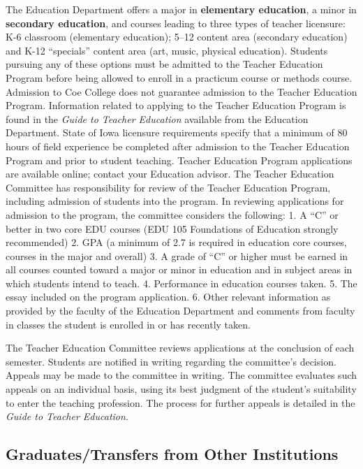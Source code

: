 \documentclass[
  letterpaper,
]{scrbook}
\begin{document}
The Education Department offers a major in \textbf{elementary
education}, a minor in \textbf{secondary education}, and courses leading
to three types of teacher licensure: K-6 classroom (elementary
education); 5--12 content area (secondary education) and K-12
``specials'' content area (art, music, physical education). Students
pursuing any of these options must be admitted to the Teacher Education
Program before being allowed to enroll in a practicum course or methods
course. Admission to Coe College does not guarantee admission to the
Teacher Education Program. Information related to applying to the
Teacher Education Program is found in the \emph{Guide to Teacher
Education} available from the Education Department. State of Iowa
licensure requirements specify that a minimum of 80 hours of field
experience be completed after admission to the Teacher Education Program
and prior to student teaching. Teacher Education Program applications
are available online; contact your Education advisor. The Teacher
Education Committee has responsibility for review of the Teacher
Education Program, including admission of students into the program. In
reviewing applications for admission to the program, the committee
considers the following: 1. A ``C'' or better in two core EDU courses
(EDU 105 Foundations of Education strongly recommended) 2. GPA (a
minimum of 2.7 is required in education core courses, courses in the
major and overall) 3. A grade of ``C'' or higher must be earned in all
courses counted toward a major or minor in education and in subject
areas in which students intend to teach. 4. Performance in education
courses taken. 5. The essay included on the program application. 6.
Other relevant information as provided by the faculty of the Education
Department and comments from faculty in classes the student is enrolled
in or has recently taken.

The Teacher Education Committee reviews applications at the conclusion
of each semester. Students are notified in writing regarding the
committee's decision. Appeals may be made to the committee in writing.
The committee evaluates such appeals on an individual basis, using its
best judgment of the student's suitability to enter the teaching
profession. The process for further appeals is detailed in the
\emph{Guide to Teacher Education}.

\hypertarget{graduatestransfers-from-other-institutions}{%
\subsection{Graduates/Transfers from Other
Institutions}\label{graduatestransfers-from-other-institutions}}
\end{document}
